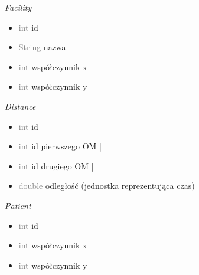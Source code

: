 \documentclass[]{article}
\begin{document}
    \textit{Facility}
    \begin{itemize}
        \item  \textcolor{gray}{int} id
        \item  \textcolor{gray}{String}  nazwa
        \item  \textcolor{gray}{int}  współczynnik x
        \item \textcolor{gray}{int}  współczynnik y
    \end{itemize}

    \textit{Distance}
    \begin{itemize}
        \item \textcolor{gray}{int}  id
        \item  \textcolor{gray}{int} id pierwszego OM |
        \item  \textcolor{gray}{int} id drugiego OM |
        \item \textcolor{gray}{double}  odległość (jednostka reprezentująca czas)
    \end{itemize}

    \textit{Patient}
    \begin{itemize}
        \item  \textcolor{gray}{int} id
        \item \textcolor{gray}{int}  współczynnik x
        \item \textcolor{gray}{int}  współczynnik y
    \end{itemize}
\end{document}
